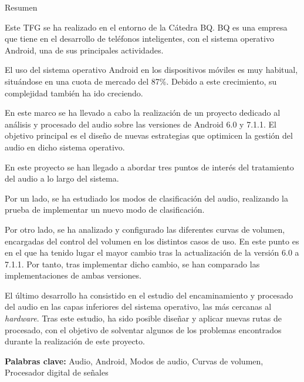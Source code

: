 \begin{center}
\Large{Resumen}
\end{center}


\bigskip

Este \gls{TFG} se ha realizado en el entorno de la Cátedra BQ. BQ es una empresa que tiene en el desarrollo de teléfonos inteligentes, con el sistema operativo Android, una de sus principales actividades. 

El uso del sistema operativo Android en los dispositivos móviles es muy habitual, situándose en una cuota de mercado del 87\%. Debido a este crecimiento, su complejidad también ha ido creciendo.

En este marco se ha llevado a cabo la realización de un proyecto dedicado al análisis y procesado del audio sobre las versiones de Android 6.0 y 7.1.1. El objetivo principal es el diseño de nuevas estrategias que optimicen la gestión del audio en dicho sistema operativo.

En este proyecto se han llegado a abordar tres puntos de interés del tratamiento del audio a lo largo del sistema.

Por un lado, se ha estudiado los modos de clasificación del audio, realizando la prueba de implementar un nuevo modo de clasificación. 

Por otro lado, se ha analizado y configurado las diferentes curvas de volumen, encargadas del control del volumen en los distintos casos de uso. En este punto es en el que ha tenido lugar el mayor cambio tras la actualización de la versión 6.0 a 7.1.1. Por tanto, tras implementar dicho cambio, se han comparado las implementaciones de ambas versiones.

El último desarrollo ha consistido en el estudio del encaminamiento y procesado del audio en las capas inferiores del sistema operativo, las más cercanas al \textit{hardware}. Tras este estudio, ha sido posible diseñar y aplicar nuevas rutas de procesado, con el objetivo de solventar algunos de los problemas encontrados durante la realización de este proyecto.


\bigskip
\bigskip
\bigskip
\bigskip
\bigskip

\textbf{Palabras clave:} Audio, Android, Modos de audio, Curvas de volumen, Procesador digital de señales